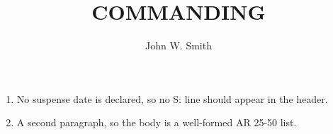 \documentclass{../armymemo}
\author{John W. Smith}\rank{CPT}\branch{CY}
\title{COMMANDING}
\begin{document}
\begin{enumerate}
	\item No suspense date is declared, so no S: line should appear in the header.
	\item A second paragraph, so the body is a well-formed AR 25-50 list.
\end{enumerate}
\end{document}
